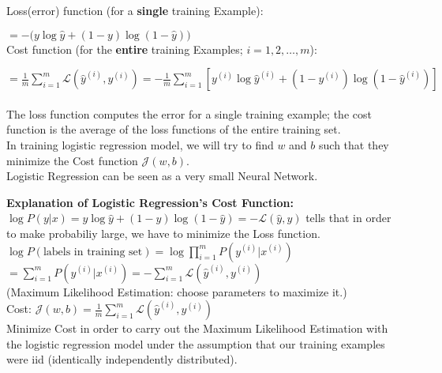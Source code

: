 \documentclass{article}
\begin{document}
    Loss(error) function (for a \textbf{single} training Example):

     $= -(y\log{\hat{y}} + (1-y)\log{(1-\hat{y}))}$\\

    Cost function (for the \textbf{entire} training Examples; $i=1,2,\dots, m$):

     $= \frac{1}{m}\sum_{i=1}^{m} \mathcal{L}(\hat{y}^{(i)}, y^{(i)}) = -\frac{1}{m}\sum_{i=1}^{m} [y^{(i)}\log{\hat{y}^{(i)}} + (1-y^{(i)})\log{(1-\hat{y}^{(i)})}]$\\\\

    The loss function computes the error for a single training example; the cost function is the average of the loss functions of the entire training set.\\

    In training logistic regression model, we will try to find $w$ and $b$ such that they minimize the Cost function $\mathcal{J}(w, b)$.\\

    Logistic Regression can be seen as a very small Neural Network.\\


\newpage

\textbf{Explanation of Logistic Regression's Cost Function:}\\

$\log{P(y |x)} = y\log \hat{y} + (1-y) \log (1-\hat{y}) = - \mathcal{L}(\hat{y},y)$ tells that in order to make probabiliy large, we have to minimize the Loss function.\\

$\log P(\text{labels in training set}) = \log \prod_{i=1}^m P(y^{(i)}|x^{(i)})$\\

$= \sum_{i=1}^m P(y^{(i)}|x^{(i)}) = -\sum_{i=1}^m \mathcal{L}(\hat{y}^{(i)}, y^{(i)})$\\

(Maximum Likelihood Estimation: choose parameters to maximize it.)\\

Cost: $\mathcal{J}(w,b)= \frac{1}{m} \sum_{i=1}^m \mathcal{L}(\hat{y}^{(i)}, y^{(i)})$\\

Minimize Cost in order to carry out the Maximum Likelihood Estimation with the logistic regression model under the assumption that our training examples were iid (identically independently distributed).\\
\end{document}

